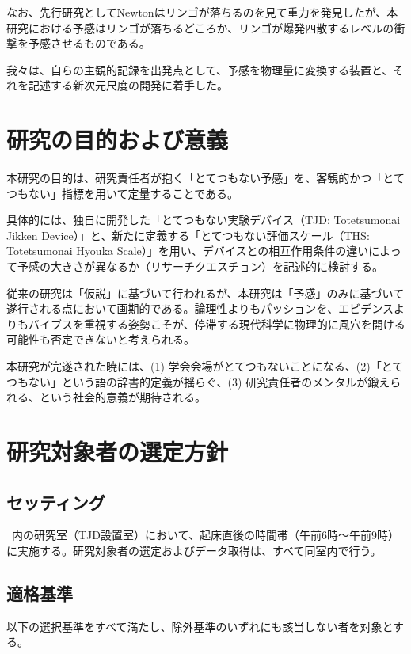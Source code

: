 \documentclass{kyodai-protocol}
\begin{document}
なお、先行研究としてNewtonはリンゴが落ちるのを見て重力を発見したが\cite{newton1687principia}、本研究における予感はリンゴが落ちるどころか、リンゴが爆発四散するレベルの衝撃を予感させるものである。

我々は、自らの主観的記録\cite{yokan202x}を出発点として、予感を物理量に変換する装置と、それを記述する新次元尺度の開発に着手した。

\section{研究の目的および意義}
\label{sec:objectives}

本研究の目的は、研究責任者が抱く「とてつもない予感」を、客観的かつ「とてつもない」指標を用いて定量することである。

具体的には、独自に開発した「とてつもない実験デバイス（TJD: Totetsumonai Jikken Device）」と、新たに定義する「とてつもない評価スケール（THS: Totetsumonai Hyouka Scale）」を用い、デバイスとの相互作用条件の違いによって予感の大きさが異なるか（リサーチクエスチョン）を記述的に検討する。

従来の研究は「仮説」に基づいて行われるが、本研究は「予感」のみに基づいて遂行される点において画期的である。論理性よりもパッションを、エビデンスよりもバイブスを重視する姿勢こそが、停滞する現代科学に物理的に風穴を開ける可能性も否定できないと考えられる\cite{dareka199x}。

本研究が完遂された暁には、(1) 学会会場がとてつもないことになる、(2)「とてつもない」という語の辞書的定義が揺らぐ、(3) 研究責任者のメンタルが鍛えられる、という社会的意義が期待される。

\section{研究対象者の選定方針}
\label{sec:subjects}

\subsection{セッティング}

\InstitutionName\ 内の研究室（TJD設置室）において、起床直後の時間帯（午前6時〜午前9時）に実施する。研究対象者の選定およびデータ取得は、すべて同室内で行う。

\subsection{適格基準}

以下の選択基準をすべて満たし、除外基準のいずれにも該当しない者を対象とする。
\end{document}
